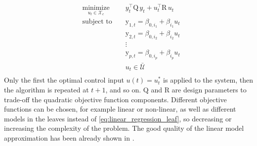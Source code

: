 \textcolor[rgb]{0.00,0.00,1.00}{
\begin{equation}\label{eq:mbCRT}
\begin{aligned}
& \underset{u_t \in \mathcal{X}_c}{\text{minimize}} & &  y^\top_t \mathrm{Q}\, y_t + u^\top_t \mathrm{R}\, u_t              \\
& \text{subject to }                                & &  \mathrm{y}_{1,t}    =   \beta_{0,i_1} + \beta_{i_1}u_t     \\
&                                                   & &  \mathrm{y}_{2,t}    =   \beta_{0,i_2} + \beta_{i_2}u_t     \\
&                                                   & &  \vdots                                                         \\
&                                                   & &  \mathrm{y}_{p,t}    =   \beta_{0,i_p} + \beta_{i_p}u_t     \\
&                                                   & &  u_t                \in  \mathcal{\bar U}                       \\
\end{aligned}
\end{equation}
Only the first the optimal control input $u(t) = u^*_t$ is applied to the system, then the algorithm is repeated at $t+1$, and so on. $\mathrm{Q}$ and $\mathrm{R}$ are design parameters to trade-off the quadratic objective function components. Different objective functions can be chosen, for example linear or non-linear, as well as different models in the leaves instead of \eqref{eq:linear_regression_leaf}, so decreasing or increasing the complexity of the problem. The good quality of the linear model approximation has been already shown in \cite{Behl201630}.}

